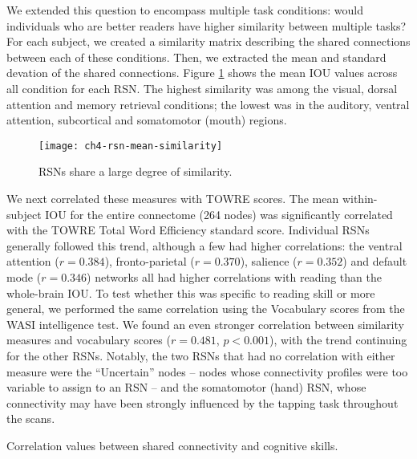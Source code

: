 We extended this question to encompass multiple task conditions: would individuals who are better readers have higher similarity between multiple tasks? For each subject, we created a similarity matrix describing the shared connections between each of these conditions. Then, we extracted the mean and standard devation of the shared connections. Figure \ref{fig:ch4-rsn-mean-similarity} shows the mean IOU values across all condition for each RSN. The highest similarity was among the visual, dorsal attention and memory retrieval conditions; the lowest was in the auditory, ventral attention, subcortical and somatomotor (mouth) regions.

\begin{figure}[t]
	\centering
	\texttt{[image: ch4-rsn-mean-similarity]}
    \caption[RSNs share a large degree of similarity.]{RSNs share a large degree of similarity. }
	\label{fig:ch4-rsn-mean-similarity}
\end{figure}

We next correlated these measures with TOWRE scores. The mean within-subject IOU for the entire connectome (264 nodes) was significantly correlated with the TOWRE Total Word Efficiency standard score. Individual RSNs generally followed this trend, although a few had higher correlations: the ventral attention ($r=0.384$), fronto-parietal ($r=0.370$), salience ($r=0.352$) and default mode ($r=0.346$) networks all had higher correlations with reading than the whole-brain IOU. To test whether this was specific to reading skill or more general, we performed the same correlation using the Vocabulary scores from the WASI intelligence test. We found an even stronger correlation between similarity measures and vocabulary scores ($r = 0.481$, $p < 0.001$), with the trend continuing for the other RSNs. Notably, the two RSNs that had no correlation with either measure were the ``Uncertain'' nodes -- nodes whose connectivity profiles were too variable to assign to an RSN -- and the somatomotor (hand) RSN, whose connectivity may have been strongly influenced by the tapping task throughout the scans.

\begin{table}[t]
	\renewcommand{\tabcolsep}{0.09cm}
	\centering
	
	\caption[Correlation values between shared connectivity and cognitive skill.]{Correlation values between shared connectivity and cognitive skills. }
	\label{table:ch4-rsn-similarity-to-reading}
\end{table}

